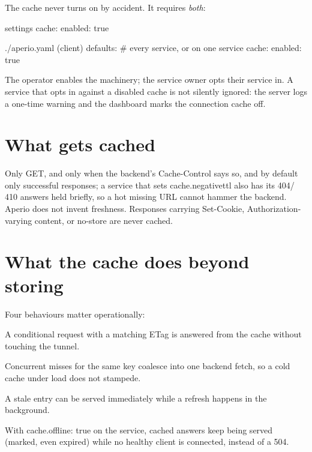 \documentclass[11pt,a4paper,oneside]{book}
\newcommand{\aperiobreakableunderscore}{\textunderscore\allowbreak}
\newcommand{\aperiocodebreaks}{\XeTeXinterchartokenstate=1 }
\newcommand{\aperiocodebreaks}{}
\DeclareRobustCommand{\code}[1]{{\ttfamily\small\aperiocodebreaks
  \let\_\aperiobreakableunderscore#1}}
\begin{document}
The cache never turns on by accident. It requires \emph{both}:

\begin{codecard}[aperioyaml]{settings}
cache:
  enabled: true
\end{codecard}

\begin{codecard}[aperioyaml]{./aperio.yaml (client)}
defaults:                      # every service, or on one service
  cache:
    enabled: true
\end{codecard}

The operator enables the machinery; the service owner opts their service
in. A service that opts in against a disabled cache is not silently
ignored: the server logs a one-time warning and the dashboard marks the
connection \code{cache off}.

\section{What gets cached}

Only \code{GET}, and only when the backend's \code{Cache-Control} says so,
and by default only successful responses; a service that sets
\code{cache.negative\_ttl} also has its \code{404}/\code{410} answers held
briefly, so a hot missing URL cannot hammer the backend. Aperio does not
invent freshness. Responses
carrying \code{Set-Cookie}, \code{Authorization}-varying content, or
\code{no-store} are never cached.

\section{What the cache does beyond storing}

Four behaviours matter operationally:

\begin{description}[leftmargin=1.6em,style=nextline]
  \item[Edge 304] A conditional request with a matching \code{ETag} is
        answered from the cache without touching the tunnel.
  \item[Single flight] Concurrent misses for the same key coalesce into
        one backend fetch, so a cold cache under load does not stampede.
  \item[Stale while revalidate] A stale entry can be served immediately
        while a refresh happens in the background.
  \item[Serve stale] With \code{cache.offline: true} on the service, cached
        answers keep being served (marked, even expired) while no healthy
        client is connected, instead of a \code{504}.
\end{description}
\end{document}
